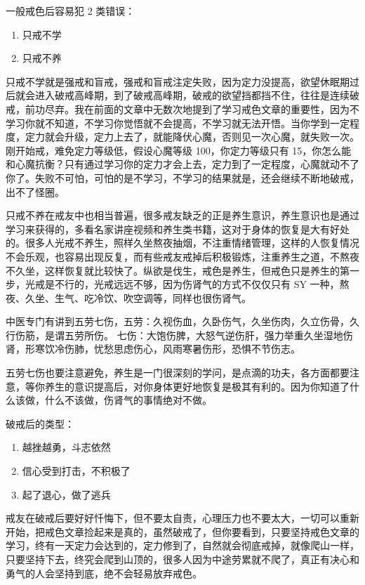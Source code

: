\documentclass[fontset=founder]{ctexart}
\begin{document}
一般戒色后容易犯 2 类错误：

\begin{enumerate}
    \item 只戒不学
    \item 只戒不养
\end{enumerate}

只戒不学就是强戒和盲戒，强戒和盲戒注定失败，因为定力没提高，欲望休眠期过后就会进入破戒高峰期，到了破戒高峰期，破戒的欲望挡都挡不住，往往是连续破戒，前功尽弃。我在前面的文章中无数次地提到了学习戒色文章的重要性，因为不学习你就不知道，不学习你觉悟就不会提高，不学习就无法开悟。当你学到一定程度，定力就会升级，定力上去了，就能降伏心魔，否则见一次心魔，就失败一次。刚开始戒，难免定力等级低，假设心魔等级 100，你定力等级只有 15，你怎么能和心魔抗衡？只有通过学习你的定力才会上去，定力到了一定程度，心魔就动不了你了。失败不可怕，可怕的是不学习，不学习的结果就是，还会继续不断地破戒，出不了怪圈。

只戒不养在戒友中也相当普遍，很多戒友缺乏的正是养生意识，养生意识也是通过学习来获得的，多看名家讲座视频和养生类书籍，这对于身体的恢复是大有好处的。很多人光戒不养生，照样久坐熬夜抽烟，不注重情绪管理，这样的人恢复情况不会乐观，也容易出现反复，而有些戒友戒掉后积极锻炼，注重养生之道，不熬夜不久坐，这样恢复就比较快了。纵欲是伐生，戒色是养生，但戒色只是养生的第一步，光戒是不行的，光戒远远不够，因为伤肾气的方式不仅仅只有 SY 一种，熬夜、久坐、生气、吃冷饮、吹空调等，同样也很伤肾气。

中医专门有讲到五劳七伤，五劳：久视伤血，久卧伤气，久坐伤肉，久立伤骨，久行伤筋，是谓五劳所伤。
七伤：大饱伤脾，大怒气逆伤肝，强力举重久坐湿地伤肾，形寒饮冷伤肺，忧愁思虑伤心，风雨寒暑伤形，恐惧不节伤志。

五劳七伤也要注意避免，养生是一门很深刻的学问，是点滴的功夫，各方面都要注意，等你养生的意识提高后，对你身体更好地恢复是极其有利的。因为你知道了什么该做，什么不该做，伤肾气的事情绝对不做。

破戒后的类型：

\begin{enumerate}
    \item 越挫越勇，斗志依然
    \item 信心受到打击，不积极了
    \item 起了退心，做了逃兵
\end{enumerate}

戒友在破戒后要好好忏悔下，但不要太自责，心理压力也不要太大，一切可以重新开始，把戒色文章捡起来是真的，虽然破戒了，但你要看到，只要坚持戒色文章的学习，终有一天定力会达到的，定力修到了，自然就会彻底戒掉，就像爬山一样，只要坚持下去，终究会爬到山顶的，很多人因为中途劳累就不爬了，真正有决心和勇气的人会坚持到底，绝不会轻易放弃戒色。
\end{document}
